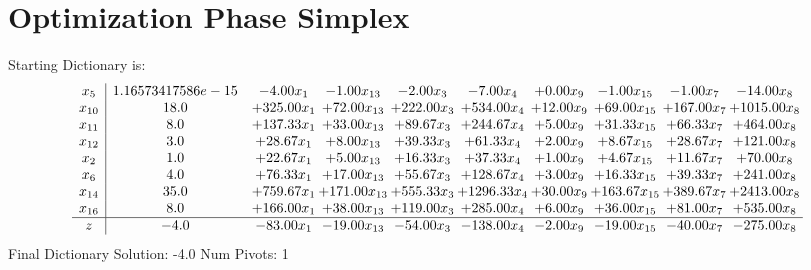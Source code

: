 \documentclass[9pt]{article}
\begin{document}
\section{Optimization Phase Simplex}
Starting Dictionary is:
\[\begin{array}{c| c c@{\hskip 2pt} c@{\hskip 2pt} c@{\hskip 2pt} c@{\hskip 2pt} c@{\hskip 2pt} c@{\hskip 2pt} c@{\hskip 2pt} c@{\hskip 2pt} }
 x_{5}   &  1.16573417586e-15 & -4.00 x_{1} & -1.00 x_{13} & -2.00 x_{3} & -7.00 x_{4} & +  0.00 x_{9} & -1.00 x_{15} & -1.00 x_{7} & -14.00 x_{8}\\
 x_{10}   &  18.0 & + 325.00 x_{1} & + 72.00 x_{13} & + 222.00 x_{3} & + 534.00 x_{4} & + 12.00 x_{9} & + 69.00 x_{15} & + 167.00 x_{7} & + 1015.00 x_{8}\\
 x_{11}   &  8.0 & + 137.33 x_{1} & + 33.00 x_{13} & + 89.67 x_{3} & + 244.67 x_{4} & +  5.00 x_{9} & + 31.33 x_{15} & + 66.33 x_{7} & + 464.00 x_{8}\\
 x_{12}   &  3.0 & + 28.67 x_{1} & +  8.00 x_{13} & + 39.33 x_{3} & + 61.33 x_{4} & +  2.00 x_{9} & +  8.67 x_{15} & + 28.67 x_{7} & + 121.00 x_{8}\\
 x_{2}   &  1.0 & + 22.67 x_{1} & +  5.00 x_{13} & + 16.33 x_{3} & + 37.33 x_{4} & +  1.00 x_{9} & +  4.67 x_{15} & + 11.67 x_{7} & + 70.00 x_{8}\\
 x_{6}   &  4.0 & + 76.33 x_{1} & + 17.00 x_{13} & + 55.67 x_{3} & + 128.67 x_{4} & +  3.00 x_{9} & + 16.33 x_{15} & + 39.33 x_{7} & + 241.00 x_{8}\\
 x_{14}   &  35.0 & + 759.67 x_{1} & + 171.00 x_{13} & + 555.33 x_{3} & + 1296.33 x_{4} & + 30.00 x_{9} & + 163.67 x_{15} & + 389.67 x_{7} & + 2413.00 x_{8}\\
 x_{16}   &  8.0 & + 166.00 x_{1} & + 38.00 x_{13} & + 119.00 x_{3} & + 285.00 x_{4} & +  6.00 x_{9} & + 36.00 x_{15} & + 81.00 x_{7} & + 535.00 x_{8}\\
\hline
z    &  -4.0 & -83.00 x_{1} & -19.00 x_{13} & -54.00 x_{3} & -138.00 x_{4} & -2.00 x_{9} & -19.00 x_{15} & -40.00 x_{7} & -275.00 x_{8}\\
\end{array}\]
Final Dictionary
Solution:  -4.0
Num Pivots:  1
\end{document}
